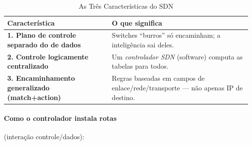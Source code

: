 \documentclass[11pt,a4paper]{article}
\begin{document}
\begin{table}[h!]
\centering
\caption{As Três Características do SDN}
\label{tab:caracteristicas_sdn}
\begin{tabularx}{\textwidth}{lX}
\toprule
\textbf{Característica} & \textbf{O que significa} \\
\midrule
\textbf{1. Plano de controle separado do de dados} & Switches ``burros'' só encaminham; a inteligência sai deles. \\
\textbf{2. Controle logicamente centralizado} & Um \emph{controlador SDN} (software) computa as tabelas para todos. \\
\textbf{3. Encaminhamento generalizado (match+action)} & Regras baseadas em campos de enlace/rede/transporte --- não apenas IP de destino. \\
\bottomrule
\end{tabularx}
\end{table}

\paragraph{Como o controlador instala rotas} (interação controle/dados):
\end{document}
